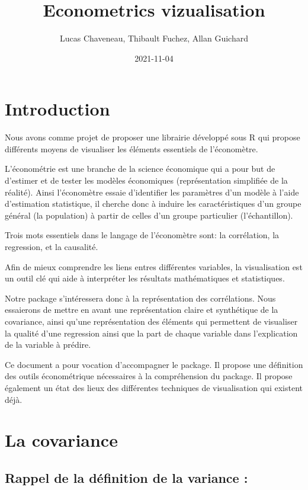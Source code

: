 \documentclass[
]{report}
\title{Econometrics vizualisation}
\author{Lucas Chaveneau, Thibault Fuchez, Allan Guichard}
\date{2021-11-04}
\begin{document}
\maketitle

{
\setcounter{tocdepth}{1}
\tableofcontents
}
\hypertarget{introduction}{%
\chapter{Introduction}\label{introduction}}

Nous avons comme projet de proposer une librairie développé sous R qui propose différents moyens de visualiser les éléments essentiels de l'économètre.

L'économétrie est une branche de la science économique qui a pour but de d'estimer et de tester les modèles économiques (représentation simplifiée de la réalité). Ainsi l'économètre essaie d'identifier les paramètres d'un modèle à l'aide d'estimation statistique, il cherche donc à induire les caractéristiques d'un groupe général (la population) à partir de celles d'un groupe particulier (l'échantillon).

Trois mots essentiels dans le langage de l'économètre sont: la corrélation, la regression, et la causalité.

Afin de mieux comprendre les liens entres différentes variables, la visualisation est un outil clé qui aide à interpréter les résultats mathématiques et statistiques.

Notre package s'intéressera donc à la représentation des corrélations. Nous essaierons de mettre en avant une représentation claire et synthétique de la covariance, ainsi qu'une représentation des éléments qui permettent de visualiser la qualité d'une regression ainsi que la part de chaque variable dans l'explication de la variable à prédire.

Ce document a pour vocation d'accompagner le package. Il propose une définition des outils économétrique nécessaires à la compréhension du package. Il propose également un état des lieux des différentes techniques de visualisation qui existent déjà.

\hypertarget{la-covariance}{%
\chapter{La covariance}\label{la-covariance}}

\hypertarget{rappel-de-la-duxe9finition-de-la-variance}{%
\section{Rappel de la définition de la variance :}\label{rappel-de-la-duxe9finition-de-la-variance}}
\end{document}
